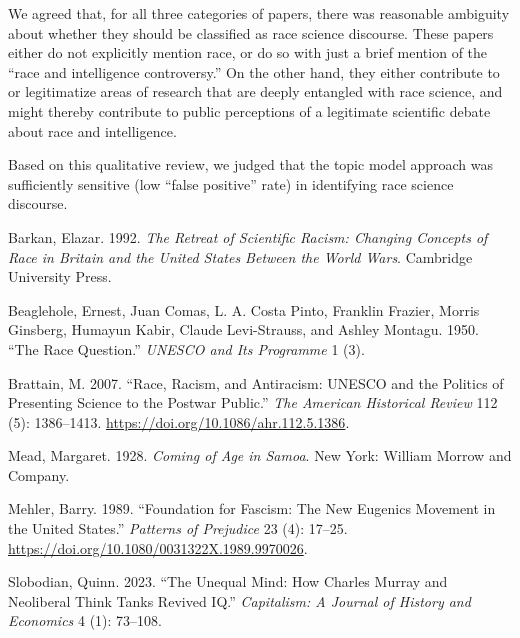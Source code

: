 \documentclass[12pt]{article}
\newlength{\cslhangindent}
\newenvironment{CSLReferences}[2] %
 {%
  \setlength{\parindent}{0pt}
  \ifodd #1 \everypar{\setlength{\hangindent}{\cslhangindent}}\ignorespaces\fi
  \ifnum #2 > 0
  \setlength{\parskip}{#2\baselineskip}
  \fi
 }%
 {}
\begin{document}
We agreed that, for all three categories of papers, there was reasonable ambiguity about whether they should be classified as race science discourse. These papers either do not explicitly mention race, or do so with just a brief mention of the ``race and intelligence controversy.'' On the other hand, they either contribute to or legitimatize areas of research that are deeply entangled with race science, and might thereby contribute to public perceptions of a legitimate scientific debate about race and intelligence.

Based on this qualitative review, we judged that the topic model approach was sufficiently sensitive (low ``false positive'' rate) in identifying race science discourse.

\hypertarget{refs}{}
\begin{CSLReferences}{1}{0}
\leavevmode{}%
Barkan, Elazar. 1992. \emph{The {Retreat} of {Scientific Racism}: {Changing Concepts} of {Race} in {Britain} and the {United States Between} the {World Wars}}. {Cambridge University Press}.

\leavevmode{}%
Beaglehole, Ernest, Juan Comas, L. A. Costa Pinto, Franklin Frazier, Morris Ginsberg, Humayun Kabir, Claude Levi-Strauss, and Ashley Montagu. 1950. {``The {Race Question}.''} \emph{UNESCO and Its Programme} 1 (3).

\leavevmode{}%
Brattain, M. 2007. {``Race, {Racism}, and {Antiracism}: {UNESCO} and the {Politics} of {Presenting Science} to the {Postwar Public}.''} \emph{The American Historical Review} 112 (5): 1386--1413. \url{https://doi.org/10.1086/ahr.112.5.1386}.

\leavevmode{}%
Mead, Margaret. 1928. \emph{Coming of {Age} in {Samoa}}. {New York}: {William Morrow and Company}.

\leavevmode{}%
Mehler, Barry. 1989. {``Foundation for Fascism: {The} New Eugenics Movement in the {United States}.''} \emph{Patterns of Prejudice} 23 (4): 17--25. \url{https://doi.org/10.1080/0031322X.1989.9970026}.

\leavevmode{}%
Slobodian, Quinn. 2023. {``The {Unequal Mind}: {How Charles Murray} and {Neoliberal Think Tanks Revived IQ}.''} \emph{Capitalism: A Journal of History and Economics} 4 (1): 73--108.

\end{CSLReferences}
\end{document}
